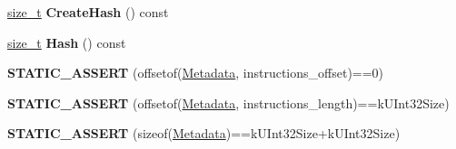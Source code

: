 \begin{DoxyCompactItemize}
\item 
\mbox{\label{classv8_1_1internal_1_1EmbeddedData_a851c132b71ef74a3cb16194cd25b54a8}} 
\mbox{\hyperlink{classsize__t}{size\+\_\+t}} {\bfseries Create\+Hash} () const
\item 
\mbox{\label{classv8_1_1internal_1_1EmbeddedData_a220979944e86c893662301b535319a0a}} 
\mbox{\hyperlink{classsize__t}{size\+\_\+t}} {\bfseries Hash} () const
\item 
\mbox{\label{classv8_1_1internal_1_1EmbeddedData_a15ad8c8bcd4047a23710e7c2afe8b371}} 
{\bfseries S\+T\+A\+T\+I\+C\+\_\+\+A\+S\+S\+E\+RT} (offsetof(\mbox{\hyperlink{structv8_1_1internal_1_1EmbeddedData_1_1Metadata}{Metadata}}, instructions\+\_\+offset)==0)
\item 
\mbox{\label{classv8_1_1internal_1_1EmbeddedData_a09fe0cf523e95e4c2e60b610db43410b}} 
{\bfseries S\+T\+A\+T\+I\+C\+\_\+\+A\+S\+S\+E\+RT} (offsetof(\mbox{\hyperlink{structv8_1_1internal_1_1EmbeddedData_1_1Metadata}{Metadata}}, instructions\+\_\+length)==k\+U\+Int32\+Size)
\item 
\mbox{\label{classv8_1_1internal_1_1EmbeddedData_a330a34bd59b213c8a925cee9f77b29a2}} 
{\bfseries S\+T\+A\+T\+I\+C\+\_\+\+A\+S\+S\+E\+RT} (sizeof(\mbox{\hyperlink{structv8_1_1internal_1_1EmbeddedData_1_1Metadata}{Metadata}})==k\+U\+Int32\+Size+k\+U\+Int32\+Size)
\end{DoxyCompactItemize}

